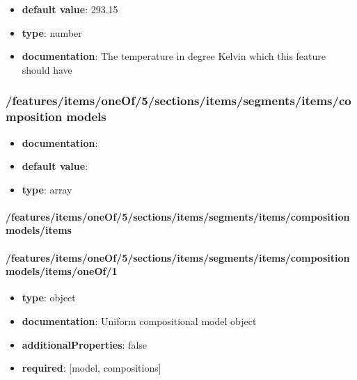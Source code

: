 \begin{itemize}\item {\bf default value}: 293.15
\item {\bf type}: number
\item {\bf documentation}: The temperature in degree Kelvin which this feature should have
\end{itemize}\subsubsection{/features/items/oneOf/5/sections/items/segments/items/composition models}
\begin{itemize}\item {\bf documentation}: 
\item {\bf default value}: 
\item {\bf type}: array
\end{itemize}\paragraph{/features/items/oneOf/5/sections/items/segments/items/composition models/items}

\paragraph{/features/items/oneOf/5/sections/items/segments/items/composition models/items/oneOf/1}
\begin{itemize}\item {\bf type}: object
\item {\bf documentation}: Uniform compositional model object
\item {\bf additionalProperties}: false
\item {\bf required}: [model, compositions]\end{itemize}
